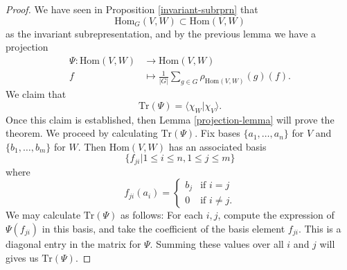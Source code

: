 \begin{proof}
We have seen in Proposition \ref{invariant-subrprn} that
 \[ \text{Hom}_G (V,W) \subset \text{Hom}(V,W) \] 
 as the invariant subrepresentation, and by the previous lemma we have a projection
\begin{align*}
\Psi \colon \text{Hom}(V,W) &\to \text{Hom}(V,W) \\
f &\mapsto \frac{1}{|G|} \sum_{g \in G} \rho_{\text{Hom}(V,W)} (g) (f).
\end{align*}
We claim that \[ \text{Tr} (\Psi) = \langle \chi_W | \chi_V \rangle. \]  Once this claim is established, then Lemma \ref{projection-lemma} will prove the theorem.  We proceed by calculating $\text{Tr} (\Psi)$.  Fix bases $\{ a_1, \ldots, a_n \}$ for $V$ and $\{ b_1, \ldots, b_m \}$ for $W$.  Then $\text{Hom}(V,W)$ has an associated basis 
\[ \{ f_{ji} | 1 \leq i \leq n, 1 \leq j \leq m\} \]
where
\[ f_{ji} (a_i) = \begin{cases} b_j &\text{if } i=j \\ 0 &\text{if } i \neq j.  \end{cases} \] 
We may calculate $\text{Tr}(\Psi)$ as follows:  For each $i,j$, compute the expression of $\Psi(f_{ji})$ in this basis, and take the coefficient of the basis element $f_{ji}$.  This is a diagonal entry in the matrix for $\Psi$. Summing these values over all $i$ and $j$ will gives us $\text{Tr}(\Psi)$.


\end{proof}
